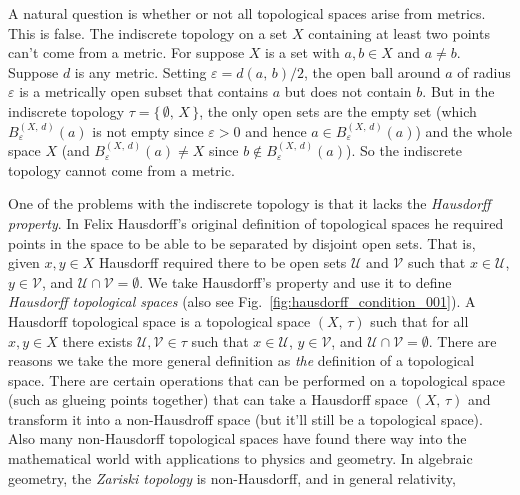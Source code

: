 \documentclass{article}
\theoremstyle{plain}
\theoremstyle{normal}
\newenvironment{definition}{%
    \pushQED{\qed}\renewcommand{\qedsymbol}{$\blacksquare$}\definitionx%
}{%
    \popQED\enddefinitionx%
}
\begin{document}
    A natural question is whether or not all topological spaces arise from
    metrics. This is false. The indiscrete topology on a set $X$ containing
    at least two points can't come from a metric. For suppose $X$ is a set
    with $a,b\in{X}$ and $a\ne{b}$. Suppose $d$ is any metric. Setting
    $\varepsilon={d}(a,\,b)/2$, the open ball around $a$ of radius
    $\varepsilon$ is a metrically open subset that contains $a$ but does not
    contain $b$. But in the indiscrete topology $\tau=\{\,\emptyset,\,X\,\}$,
    the only open sets are the empty set (which $B_{\varepsilon}^{(X,\,d)}(a)$
    is not empty since $\varepsilon>0$ and hence
    $a\in{B}_{\varepsilon}^{(X,\,d)}(a)$) and the whole space $X$
    (and $B_{\varepsilon}^{(X,\,d)}(a)\ne{X}$ since
    $b\notin{B}_{\varepsilon}^{(X,\,d)}(a)$). So the indiscrete topology cannot
    come from a metric.
    \par\hfill\par
    One of the problems with the indiscrete topology is that it lacks the
    \textit{Hausdorff property}. In Felix Hausdorff's original definition of
    topological spaces he required points in the space to be able to be
    separated by disjoint open sets. That is, given $x,y\in{X}$ Hausdorff
    required there to be open sets $\mathcal{U}$ and $\mathcal{V}$ such that
    $x\in\mathcal{U}$, $y\in\mathcal{V}$, and
    $\mathcal{U}\cap\mathcal{V}=\emptyset$. We take Hausdorff's property and
    use it to define \textit{Hausdorff topological spaces}
    (also see Fig.~\ref{fig:hausdorff_condition_001}).
    \begin{definition}[\textbf{Hausdorff Topological Space}]
        A Hausdorff topological space is a topological space $(X,\,\tau)$ such
        that for all $x,y\in{X}$ there exists $\mathcal{U},\mathcal{V}\in\tau$
        such that $x\in\mathcal{U}$, $y\in\mathcal{V}$, and
        $\mathcal{U}\cap\mathcal{V}=\emptyset$.
    \end{definition}
    There are reasons we take the more general definition as \textit{the}
    definition of a topological space. There are certain operations that can be
    performed on a topological space (such as glueing points together) that can
    take a Hausdorff space $(X,\,\tau)$ and transform it into a
    non-Hausdroff space (but it'll still be a topological space). Also many
    non-Hausdorff topological spaces have found there way into the mathematical
    world with applications to physics and geometry. In algebraic geometry,
    the \textit{Zariski topology} is non-Hausdorff, and in general relativity,
\end{document}
